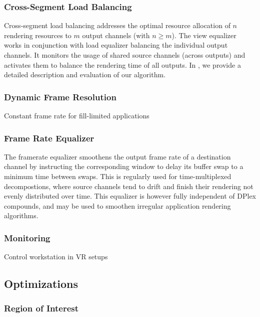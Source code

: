\documentclass[journal]{vgtc}                %
\begin{document}
\subsubsection{Cross-Segment Load Balancing}

Cross-segment load balancing addresses the optimal resource allocation of $n$
rendering resources to $m$ output channels (with $n\geq m$). The view equalizer
works in conjunction with load equalizer balancing the individual output
channels. It monitors the usage of shared source channels (across outputs) and
activates them to balance the rendering time of all outputs. In \cite{EEP:11},
we provide a detailed description and evaluation of our algorithm.

\subsubsection{Dynamic Frame Resolution}

Constant frame rate for fill-limited applications

\subsubsection{Frame Rate Equalizer}\label{SEC_framerateEq}

The framerate equalizer smoothens the output frame rate of a destination
channel by instructing the corresponding window to delay its buffer swap to a
minimum time between swaps. This is regularly used for time-multiplexed
decompostions, where source channels tend to drift and finish their rendering
not evenly distributed over time. This equalizer is however fully independent of
DPlex compounds, and may be used to smoothen irregular application rendering
algorithms.

\subsubsection{Monitoring}

Control workstation in VR setups

\subsection{Optimizations}

\subsubsection{Region of Interest}
\end{document}

